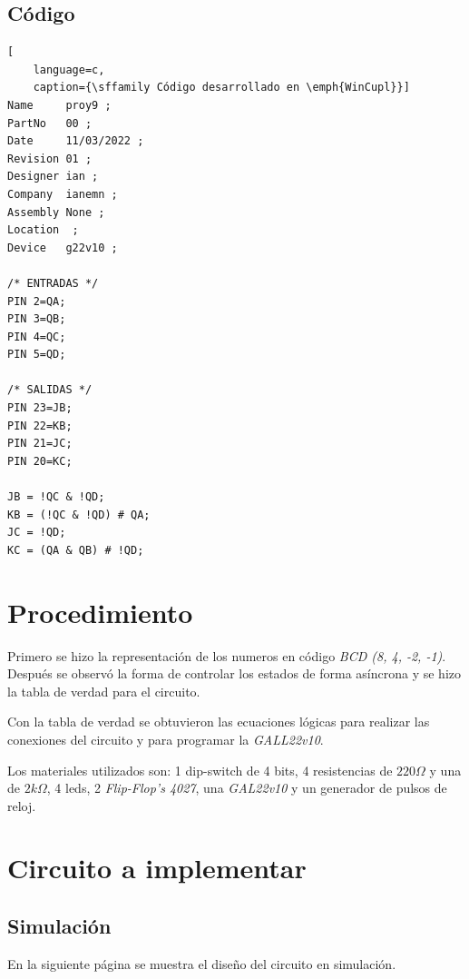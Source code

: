 \documentclass[12pt, oneside]{article}
\begin{document}
\newpage
\subsection{Código}
\begin{lstlisting}[
    language=c,
    caption={\sffamily Código desarrollado en \emph{WinCupl}}]
Name     proy9 ;
PartNo   00 ;
Date     11/03/2022 ;
Revision 01 ;
Designer ian ;
Company  ianemn ;
Assembly None ;
Location  ;
Device   g22v10 ;

/* ENTRADAS */
PIN 2=QA;
PIN 3=QB;
PIN 4=QC;
PIN 5=QD;

/* SALIDAS */
PIN 23=JB;
PIN 22=KB;
PIN 21=JC;
PIN 20=KC;

JB = !QC & !QD;
KB = (!QC & !QD) # QA;
JC = !QD;
KC = (QA & QB) # !QD;
\end{lstlisting}

\newpage
\section{Procedimiento}
{\sffamily\large
    \hspace{0.5cm} Primero se hizo la representación de los numeros en código
    \emph{BCD (8, 4, -2, -1)}. Después se observó la forma de controlar los estados
    de forma asíncrona y se hizo la tabla de verdad para el circuito.

    \hspace{0.5cm} Con la tabla de verdad se obtuvieron las ecuaciones lógicas para
    realizar las conexiones del circuito y para programar la \emph{GALL22v10}.

    \hspace{0.5cm} Los materiales utilizados son: 1 dip-switch de 4 bits, 4 resistencias
    de $220\Omega$ y una de $2k\Omega$, 4 leds, 2 \emph{Flip-Flop's 4027}, una
    \emph{GAL22v10} y un generador de pulsos de reloj.

}

\section{Circuito a implementar}
\subsection{Simulación}
{\sffamily\large
    \hspace{0.5cm} En la siguiente página se muestra el diseño del circuito en simulación.

    \newpage
    
}
\end{document}
